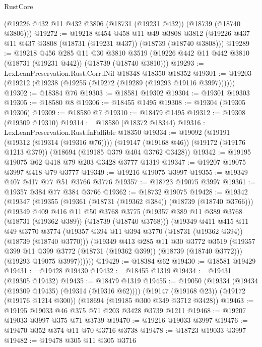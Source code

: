 \begin{lexlean}{RustCore}
\begin{coremodule}
    (@19226 @432 @11 @432 @3806 (@18731 (@19231 @432)) (@18739 (@18740 @3806)))
@19272 := @19218
    @454
    @458
    @11
    @49
    @3808
    @3812
    (@19226 @437 @11 @437 @3808 (@18731 (@19231 @437)) (@18739 (@18740 @3808)))
@19289 := @19218
    @456
    @285
    @11
    @30
    @3810
    @3519
    (@19226 @442 @11 @442 @3810 (@18731 (@19231 @442)) (@18739 (@18740 @3810)))
@19293 := LexLeanPreservation.Rust.Corr.lNil @18348 @18350 @18352
@19301 := @19203 (@19212 (@19238 (@19255 (@19272 (@19289 (@19293 @19116 @3997))))))
@19302 := @18384 @76
@19303 := @18581 @19302
@19304 := @19301 @19303
@19305 := @18580 @8
@19306 := @18455 @1495
@19308 := @19304 (@19305 @19306)
@19309 := @18580 @7
@19310 := @18479 @1495
@19312 := @19308 (@19309 @19310)
@19314 := @18580 (@18372 @18344)
@19316 := LexLeanPreservation.Rust.fnFallible @18350
@19334 := @19092
    (@19191 (@19312 (@19314 (@19316 @76))))
    (@19147 (@19168 @46))
    (@19172 (@19176 @1213 @379))
    (@18694 (@19185 @379 @404 @3762 @3428))
@19342 := @19195 @19075 @62 @418 @79 @203 @3428 @3777 @1319
@19347 := @19207 @19075 @3997 @418 @79 @3777
@19349 := @19216 @19075 @3997
@19355 := @19349 @407 @417 @77 @51 @3766 @3776
@19357 := @18723 @19075 @3997
@19361 := @19357 @384 @77 @384 @3766
@19362 := @18732 @19075
@19428 := @19342
    (@19347
      (@19355
        (@19361 (@18731 (@19362 @384)) (@18739 (@18740 @3766)))
        (@19349
          @409
          @416
          @11
          @50
          @3768
          @3775
          (@19357 @389 @11 @389 @3768 (@18731 (@19362 @389)) (@18739 (@18740 @3768)))
          (@19349
            @411
            @415
            @11
            @49
            @3770
            @3774
            (@19357 @394 @11 @394 @3770 (@18731 (@19362 @394)) (@18739 (@18740 @3770)))
            (@19349
              @413
              @285
              @11
              @30
              @3772
              @3519
              (@19357 @399 @11 @399 @3772 (@18731 (@19362 @399)) (@18739 (@18740 @3772)))
              (@19293 @19075 @3997))))))
@19429 := @18384 @62
@19430 := @18581 @19429
@19431 := @19428 @19430
@19432 := @18455 @1319
@19434 := @19431 (@19305 @19432)
@19435 := @18479 @1319
@19455 := @19050
    (@19334 (@19434 (@19309 @19435) (@19314 (@19316 @62))))
    (@19147 (@19168 @23))
    (@19172 (@19176 @1214 @300))
    (@18694 (@19185 @300 @349 @3712 @3428))
@19463 := @19195 @19033 @46 @375 @71 @203 @3428 @3739 @1211
@19468 := @19207 @19033 @3997 @375 @71 @3739
@19470 := @19216 @19033 @3997
@19476 := @19470 @352 @374 @11 @70 @3716 @3738
@19478 := @18723 @19033 @3997
@19482 := @19478 @305 @11 @305 @3716

\end{coremodule}
\end{lexlean}
